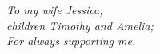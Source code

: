 \begin{dedication}
    \centering \huge \itshape{}
    To my wife Jessica, \\
    children Timothy and Amelia;\\
    For always supporting me.
\end{dedication}
